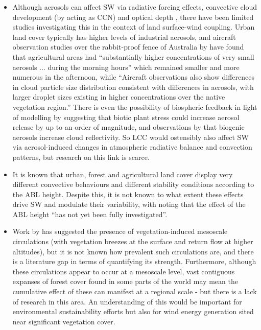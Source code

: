 \begin{itemize}
	\item Although aerosols can affect \ac{SW} via radiative forcing effects, convective cloud development (by acting as \ac{CCN}) and optical depth \citep{li2020}, there have been limited studies investigating this in the context of land surface-wind coupling. Urban land cover typically has higher levels of industrial aerosols, and aircraft observation studies over the rabbit-proof fence of Australia by \citet{junkermann2009, nair2011_aerosol} have found that agricultural areas had “substantially higher concentrations of very small aerosols ... during the morning hours” which remained smaller and more numerous in the afternoon, while “Aircraft observations also show differences in cloud particle size distribution consistent with differences in aerosols, with larger droplet sizes existing in higher concentrations over the native vegetation region.” There is even the possibility of biospheric feedback in light of modelling by \citet{taipale2021} suggesting that biotic plant stress could increase aerosol release by up to an order of magnitude, and observations by \citet{yli-juuti2021} that biogenic aerosols increase cloud reflectivity. So \ac{LCC} would ostensibly also affect \ac{SW} via aerosol-induced changes in atmospheric radiative balance and convection patterns, but research on this link is scarce.
	\item It is known that urban, forest and agricultural land cover display very different convective behaviours and different stability conditions according to the \ac{ABL} height. Despite this, it is not known to what extent these effects drive \ac{SW} and modulate their variability, with \citet{pena2013} noting that the effect of the ABL height “has not yet been fully investigated”.
	\item Work by \citet{hong1995, mahmood2011, mahmood2014, zhuojia1995} has suggested the presence of vegetation-induced mesoscale circulations (with vegetation breezes at the surface and return flow at higher altitudes), but it is not known how prevalent such circulations are, and there is a literature gap in terms of quantifying its strength. Furthermore, although these circulations appear to occur at a mesoscale level, vast contiguous expanses of forest cover found in some parts of the world may mean the cumulative effect of these can manifest at a regional scale - but there is a lack of research in this area. An understanding of this would be important for environmental sustainability efforts but also for wind energy generation sited near significant vegetation cover.
\end{itemize}





